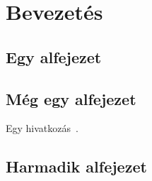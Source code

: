 \chapter{Bevezetés}
\label{chap:intro}


\section{Egy alfejezet}

\section{Még egy alfejezet}

Egy hivatkozás~\cite{Martin:2008:CCH:1388398, gerrit, pep8}.

\section{Harmadik alfejezet}


